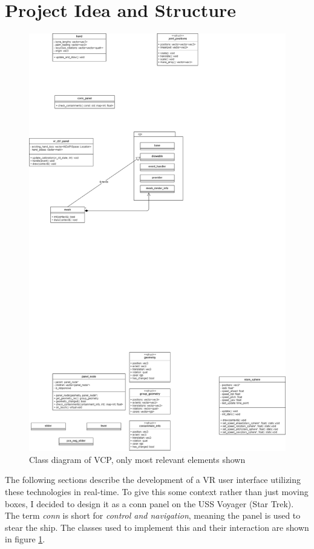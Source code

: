 \documentclass[hyperref, bachelorofscience]{cgvpub}
\begin{document}
\section{Project Idea and Structure}
\begin{figure}
	\includegraphics[width=\linewidth]{../pics/uml}
	\caption[Class diagram of \gls{VCP}]{Class diagram of \gls{VCP}, only most relevant elements shown}
	\label{fig:uml}
\end{figure}

The following sections describe the development of a VR user interface utilizing these technologies in real-time. To give this some context rather than just moving boxes, I decided to design it as a conn panel on the USS Voyager (Star Trek). The term \emph{conn} is short for \emph{control and navigation}, meaning the panel is used to stear the ship. The classes used to implement this and their interaction are shown in figure \ref{fig:uml}.
\end{document}
